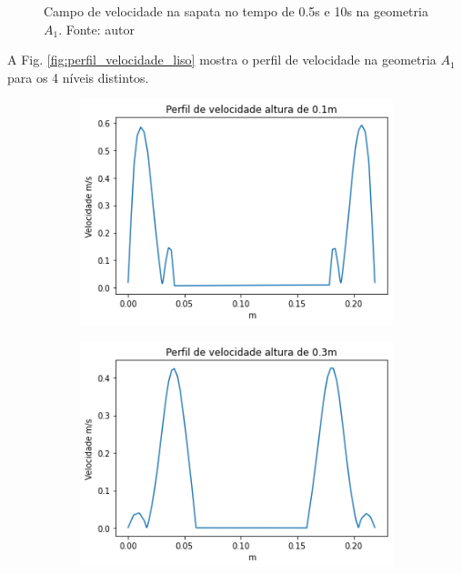 \begin{figure}[H]
    	\caption{Campo de velocidade na sapata no tempo de 0.5s e 10s na geometria $A_1$. Fonte: autor}
    	\label{fig:perfil_velocidade_liso_sapata_paraview_0_5s}
\end{figure}
    
 A Fig. \ref{fig:perfil_velocidade_liso} mostra o perfil de velocidade na geometria $A_1$ para os 4 níveis distintos.
\begin{figure}[H]
    	\begin{subfigure}[b]{0.42\linewidth}
    		\includegraphics[width=\linewidth]{img/perfil_vel/liso/perfil_velocidade_liso_100.png}
    	\end{subfigure}
    	\begin{subfigure}[b]{0.42\linewidth}
    		\includegraphics[width=\linewidth]{img/perfil_vel/liso/perfil_velocidade_liso_300.png}

\end{subfigure}
\end{figure}
